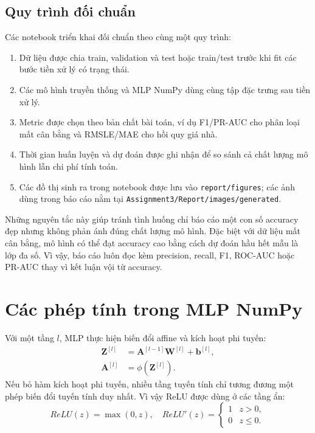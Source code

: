\documentclass[12pt,a4paper]{report}
\newcommand{\modelpath}[1]{\texttt{#1}}
\begin{document}
\subsection{Quy trình đối chuẩn}
Các notebook triển khai đối chuẩn theo cùng một quy trình:
\begin{enumerate}
    \item Dữ liệu được chia train, validation và test hoặc train/test trước khi fit các bước tiền xử lý có trạng thái.
    \item Các mô hình truyền thống và MLP NumPy dùng cùng tập đặc trưng sau tiền xử lý.
    \item Metric được chọn theo bản chất bài toán, ví dụ F1/PR-AUC cho phân loại mất cân bằng và RMSLE/MAE cho hồi quy giá nhà.
    \item Thời gian huấn luyện và dự đoán được ghi nhận để so sánh cả chất lượng mô hình lẫn chi phí tính toán.
    \item Các đồ thị sinh ra trong notebook được lưu vào \modelpath{report/figures}; các ảnh dùng trong báo cáo nằm tại \modelpath{Assignment3/Report/images/generated}.
\end{enumerate}

Những nguyên tắc này giúp tránh tình huống chỉ báo cáo một con số accuracy đẹp nhưng không phản ánh đúng chất lượng mô hình.
Đặc biệt với dữ liệu mất cân bằng, mô hình có thể đạt accuracy cao bằng cách dự đoán hầu hết mẫu là lớp đa số.
Vì vậy, báo cáo luôn đọc kèm precision, recall, F1, ROC-AUC hoặc PR-AUC thay vì kết luận vội từ accuracy.

\section{Các phép tính trong MLP NumPy}
Với một tầng $l$, MLP thực hiện biến đổi affine và kích hoạt phi tuyến:
\begin{align}
    \mathbf{Z}^{[l]} &= \mathbf{A}^{[l-1]}\mathbf{W}^{[l]} + \mathbf{b}^{[l]}, \\
    \mathbf{A}^{[l]} &= \phi(\mathbf{Z}^{[l]}).
\end{align}
Nếu bỏ hàm kích hoạt phi tuyến, nhiều tầng tuyến tính chỉ tương đương một phép biến đổi tuyến tính duy nhất. Vì vậy ReLU được dùng ở các tầng ẩn:
\begin{equation}
    ReLU(z) = \max(0, z), \quad
    ReLU'(z) =
    \begin{cases}
        1 & z > 0,\\
        0 & z \le 0.
    \end{cases}
\end{equation}
\end{document}
